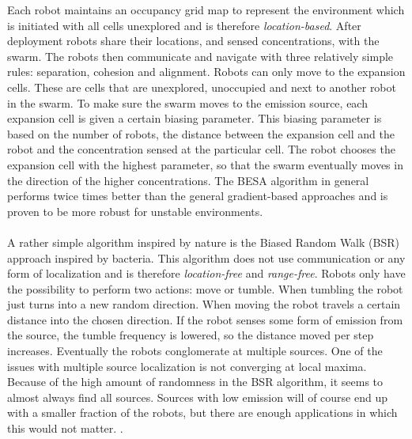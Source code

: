 		Each robot maintains an occupancy grid map to represent the environment which is initiated with all cells unexplored and is therefore \emph{location-based}.
		After deployment robots share their locations, and sensed concentrations, with the swarm.
		The robots then communicate and navigate with three relatively simple rules: separation, cohesion and alignment.
		Robots can only move to the expansion cells. 
		These are cells that are unexplored, unoccupied and next to another robot in the swarm.
		To make sure the swarm moves to the emission source, each expansion cell is given a certain biasing parameter.
		This biasing parameter is based on the number of robots, the distance between the expansion cell and the robot and the concentration sensed at the particular cell.
		The robot chooses the expansion cell with the highest parameter, so that the swarm eventually moves in the direction of the higher concentrations.
		The BESA algorithm in general performs twice times better than the general gradient-based approaches and is proven to be more robust for unstable environments. \cite{cui2004swarm}
		\\ \\
		A rather simple algorithm inspired by nature is the Biased Random Walk (BSR) approach inspired by bacteria.
		This algorithm does not use communication or any form of localization and is therefore \emph{location-free} and \emph{range-free}.
		Robots only have the possibility to perform two actions: move or tumble. 
		When tumbling the robot just turns into a new random direction. 
		When moving the robot travels a certain distance into the chosen direction. 
		If the robot senses some form of emission from the source, the tumble frequency is lowered, so the distance moved per step increases.
		Eventually the robots conglomerate at multiple sources.
		One of the issues with multiple source localization is not converging at local maxima.
		Because of the high amount of randomness in the BSR algorithm, it seems to almost always find all sources. 
		Sources with low emission will of course end up with a smaller fraction of the robots, but there are enough applications in which this would not matter. \cite{dhariwal2004bacterium}.

